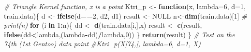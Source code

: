 \documentclass[12pt]{article}
\newenvironment{Shaded}{\begin{snugshade}}{\end{snugshade}}
\newcommand{\AttributeTok}[1]{\textcolor[rgb]{0.13,0.29,0.53}{#1}}
\newcommand{\CommentTok}[1]{\textcolor[rgb]{0.56,0.35,0.01}{\textit{#1}}}
\newcommand{\ConstantTok}[1]{\textcolor[rgb]{0.56,0.35,0.01}{#1}}
\newcommand{\ControlFlowTok}[1]{\textcolor[rgb]{0.13,0.29,0.53}{\textbf{#1}}}
\newcommand{\DecValTok}[1]{\textcolor[rgb]{0.00,0.00,0.81}{#1}}
\newcommand{\FunctionTok}[1]{\textcolor[rgb]{0.13,0.29,0.53}{\textbf{#1}}}
\newcommand{\NormalTok}[1]{#1}
\newcommand{\OtherTok}[1]{\textcolor[rgb]{0.56,0.35,0.01}{#1}}
\newcommand{\SpecialCharTok}[1]{\textcolor[rgb]{0.81,0.36,0.00}{\textbf{#1}}}
\begin{document}
\begin{Shaded}
\begin{Highlighting}[]
\CommentTok{\# Triangle Kernel function, x is a point}
\NormalTok{Ktri\_p }\OtherTok{\textless{}{-}} \ControlFlowTok{function}\NormalTok{(x, }\AttributeTok{lambda=}\DecValTok{6}\NormalTok{, }\AttributeTok{d=}\DecValTok{1}\NormalTok{, train.data)\{}
\NormalTok{    d }\OtherTok{\textless{}{-}} \FunctionTok{ifelse}\NormalTok{(d}\SpecialCharTok{==}\DecValTok{2}\NormalTok{, d2, d1)}
\NormalTok{    result }\OtherTok{\textless{}{-}} \ConstantTok{NULL}
\NormalTok{    n}\OtherTok{\textless{}{-}}\FunctionTok{dim}\NormalTok{(train.data)[}\DecValTok{1}\NormalTok{]}
    \CommentTok{\# print(n)}
    \ControlFlowTok{for}\NormalTok{ (i }\ControlFlowTok{in} \DecValTok{1}\SpecialCharTok{:}\NormalTok{n)\{}
\NormalTok{        dd }\OtherTok{\textless{}{-}} \FunctionTok{d}\NormalTok{(train.data[i,],x)}
\NormalTok{        result }\OtherTok{\textless{}{-}} \FunctionTok{c}\NormalTok{(result, }\FunctionTok{ifelse}\NormalTok{(dd}\SpecialCharTok{\textless{}}\NormalTok{lambda,(lambda}\SpecialCharTok{{-}}\NormalTok{dd)}\SpecialCharTok{/}\NormalTok{lambda,}\DecValTok{0}\NormalTok{))}
\NormalTok{    \}}
    \FunctionTok{return}\NormalTok{(result)}
\NormalTok{\}}
\CommentTok{\# Test on the 74th (1st Gentoo) data point}
\CommentTok{\#Ktri\_p(X[74,], lambda=6, d=1, X)}


\end{Highlighting}
\end{Shaded}
\end{document}
